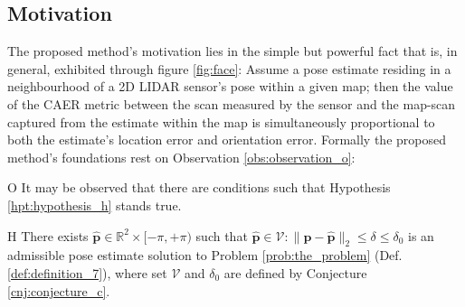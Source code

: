 \subsection{Motivation}

The proposed method's motivation lies in the simple but powerful fact that is,
in general, exhibited through figure \ref{fig:face}: Assume a pose estimate
residing in a neighbourhood of a 2D LIDAR sensor's pose within a given map;
then the value of the CAER metric between the scan measured by the sensor and
the map-scan captured from the estimate within the map is simultaneously
proportional to both the estimate's location error and orientation error.
Formally the proposed method's foundations rest on Observation
\ref{obs:observation_o}:

\begin{customobs}{O}
  \label{obs:observation_o} It may be observed that there are conditions such
  that Hypothesis \ref{hpt:hypothesis_h} stands true.
\end{customobs}

\begin{customhpt}{H}
  \label{hpt:hypothesis_h}
  There exists $\hat{\bm{p}} \in  \mathbb{R}^2 \times [-\pi,+\pi)$ such that
  $\hat{\bm{p}} \in \mathcal{V}: \|\bm{p}-\hat{\bm{p}}\|_2 \leq \delta \leq \delta_0$
  is an admissible pose estimate solution to Problem \ref{prob:the_problem}
  (Def. \ref{def:definition_7}), where set $\mathcal{V}$ and $\delta_0$ are
  defined by Conjecture
  \ref{cnj:conjecture_c}.
\end{customhpt}

